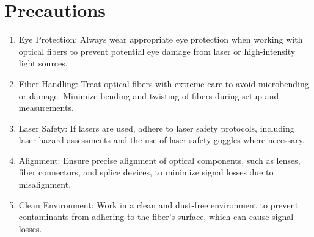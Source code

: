 \chapter{Precautions}%
\begin{enumerate}

\item Eye Protection: Always wear appropriate eye protection when working with optical fibers to prevent potential eye damage from laser or high-intensity light sources.

\item Fiber Handling: Treat optical fibers with extreme care to avoid microbending or damage. Minimize bending and twisting of fibers during setup and measurements.

\item Laser Safety: If lasers are used, adhere to laser safety protocols, including laser hazard assessments and the use of laser safety goggles where necessary.

\item Alignment: Ensure precise alignment of optical components, such as lenses, fiber connectors, and splice devices, to minimize signal losses due to misalignment.

\item Clean Environment: Work in a clean and dust-free environment to prevent contaminants from adhering to the fiber's surface, which can cause signal losses.

\end{enumerate}